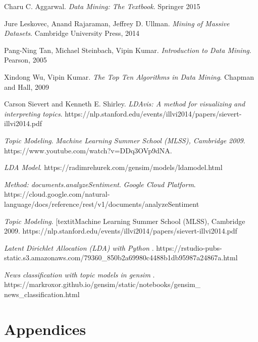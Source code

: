 \documentclass{neu_handout}
\begin{document}
\newpage

\begin{thebibliography}{9}

Charu C. Aggarwal. 
\textit{Data Mining: The Textbook}. 
Springer 2015

Jure Leskovec, Anand Rajaraman, Jeffrey D. Ullman. 
\textit{Mining of Massive Datasets}. 
Cambridge University Press, 2014

Pang-Ning Tan, Michael Steinbach, Vipin Kumar. 
\textit{Introduction to Data Mining}. 
Pearson, 2005

Xindong Wu, Vipin Kumar.
\textit{The Top Ten Algorithms in Data Mining}. 
Chapman and Hall, 2009

Carson Sievert and Kenneth E. Shirley. 
\textit{LDAvis: A method for visualizing and interpreting topics}. 
https://nlp.stanford.edu/events/illvi2014/papers/sievert-illvi2014.pdf
 
\textit{Topic Modeling}.
\textit{Machine Learning Summer School (MLSS), Cambridge 2009}. 
https://www.youtube.com/watch?v=DDq3OVp9dNA.

\textit{LDA Model}.
https://radimrehurek.com/gensim/models/ldamodel.html

\textit{Method: documents.analyzeSentiment}.
\textit{Google Cloud Platform}. 
https://cloud.google.com/natural-language/docs/reference/rest/v1/documents/analyzeSentiment


\textit{Topic Modeling}.
[textit{Machine Learning Summer School (MLSS), Cambridge 2009}. 
https://nlp.stanford.edu/events/illvi2014/papers/sievert-illvi2014.pdf

\textit{Latent Dirichlet Allocation (LDA) with Python
}.
https://rstudio-pubs-static.s3.amazonaws.com/79360\_850b2a69980c4488b1db95987a24867a.html


\textit{News classification with topic models in gensim
}.
https://markroxor.github.io/gensim/static/notebooks/gensim\_
news\_classification.html \\

\end{thebibliography}

\newpage

\appendix
\section{Appendices}
\end{document}
